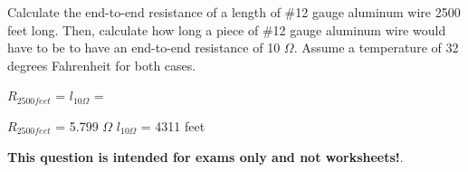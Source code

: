 

Calculate the end-to-end resistance of a length of \#12 gauge aluminum wire 2500 feet long.  Then, calculate how long a piece of \#12 gauge aluminum wire would have to be to have an end-to-end resistance of 10 $\Omega$.  Assume a temperature of 32 degrees Fahrenheit for both cases.

\vskip 10pt

$R_{2500feet}$ = \hskip 150pt $l_{10\Omega}$ = 







$R_{2500feet}$ = 5.799 $\Omega$ \hskip 100pt $l_{10\Omega}$ = 4311 feet







{\bf This question is intended for exams only and not worksheets!}.



